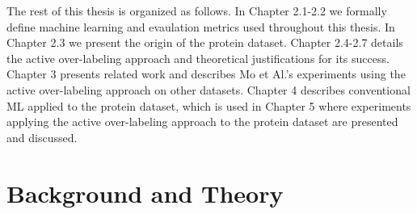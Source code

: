 \documentclass[ms]{nuthesis}
\begin{document}
\par The rest of this thesis is organized as follows. In Chapter 2.1-2.2 we formally define machine learning
and evaulation metrics used throughout this thesis. In Chapter 2.3 we present the origin of the protein dataset.
 Chapter 2.4-2.7 details the active over-labeling approach and theoretical justifications for its success.
 Chapter 3 presents related work and describes Mo et Al.'s experiments using the active over-labeling approach on
  other datasets. Chapter 4 describes conventional ML applied to the protein dataset, which is used in Chapter 5 where
  experiments applying the active over-labeling approach to the protein dataset are presented and discussed.



\chapter{Background and Theory}
\end{document}
